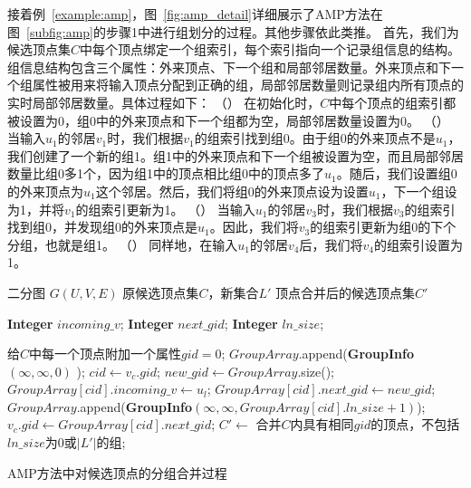 \begin{example}
  接着例~\ref{example:amp}，图~\ref{fig:amp_detail}详细展示了AMP方法在图~\ref{subfig:amp}的步骤\Num1中进行组划分的过程。其他步骤依此类推。
  首先，我们为候选顶点集$C$中每个顶点绑定一个组索引，每个索引指向一个记录组信息的结构。组信息结构包含三个属性：外来顶点、下一个组和局部邻居数量。外来顶点和下一个组属性被用来将输入顶点分配到正确的组，局部邻居数量则记录组内所有顶点的实时局部邻居数量。具体过程如下：
  （） 在初始化时，$C$中每个顶点的组索引都被设置为0，组0中的外来顶点和下一个组都为空，局部邻居数量设置为0。
  （） 当输入$u_1$的邻居$v_1$时，我们根据$v_1$的组索引找到组0。由于组0的外来顶点不是$u_1$，我们创建了一个新的组1。组1中的外来顶点和下一个组被设置为空，而且局部邻居数量比组0多1个，因为组1中的顶点相比组0中的顶点多了$u_1$。随后，我们设置组0的外来顶点为$u_1$	​这个邻居。然后，我们将组0的外来顶点设为设置$u_1$，下一个组设为1，并将$v_1$的组索引更新为1。
  （） 当输入$u_1$的邻居$v_3$时，我们根据$v_3$的组索引找到组0，并发现组0的外来顶点是$u_1$。因此，我们将$v_3$的组索引更新为组0的下个分组，也就是组1。
  （） 同样地，在输入$u_1$的邻居$v_4$后，我们将$v_4$的组索引设置为1。
  
\end{example}





\begin{algorithm}[t]
  \begin{algorithmic}[1]
    \normalsize
    \renewcommand{\algorithmicrequire}{\textbf{数据:}}
    \REQUIRE 二分图 $G(U,V,E)$
    \renewcommand{\algorithmicrequire}{\textbf{输入:}}
    \REQUIRE 原候选顶点集$C$，新集合$L'$
    \ENSURE 顶点合并后的候选顶点集$C'$
    
    \renewcommand{\algorithmicwhile}{\textbf{struct}}
    \renewcommand{\algorithmicdo}{\textbf{:}}
      \STATE \textbf{Integer} $incoming\_v$;
      \STATE \textbf{Integer} $next\_gid$;
      \STATE \textbf{Integer} $ln\_size$;
    \ENDWHILE


    \renewcommand{\algorithmicwhile}{\textbf{procedure}}
    \renewcommand{\algorithmicdo}{\textbf{do}}


    \STATE 给$C$中每一个顶点附加一个属性$gid=0$;
    \STATE $GroupArray$\textsf{.append}(\textbf{GroupInfo}$(\infty, \infty, 0)$ );
        \STATE $cid \leftarrow v_c.gid$;
          \STATE $new\_gid \leftarrow GroupArray$\textsf{.size()};
          \STATE $GroupArray[cid].incoming\_v \leftarrow u_l$;
          \STATE $GroupArray[cid].next\_gid \leftarrow new\_gid$;
          \STATE $GroupArray$\textsf{.append}(\textbf{GroupInfo$(\infty, \infty, GroupArray[cid].ln\_size + 1)$});
        \ENDIF
      \STATE $v_c.gid\leftarrow GroupArray[cid].next\_gid$; 
      \ENDFOR
    \ENDFOR
    \STATE $C'\leftarrow$ 合并$C$内具有相同$gid$的顶点，不包括$ln\_size$为0或$|L'|$的组;

    \ENDWHILE

  \end{algorithmic}
  \caption{AMP方法中对候选顶点的分组合并过程}
  \label{alg:amp}
\end{algorithm}

